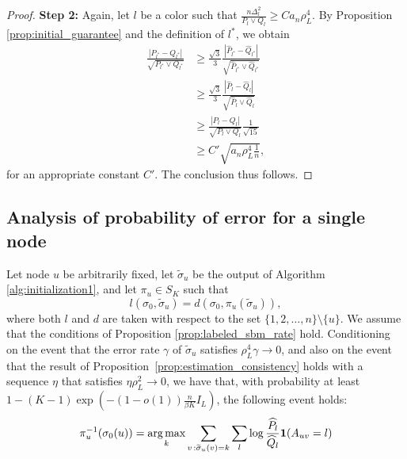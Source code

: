 \documentclass{article}
\begin{document}
\begin{proof}
\textbf{Step 2:} Again, let $l$ be a color such that $\frac{n \Delta_l^2}{P_l \vee Q_l} \geq C a_n \rho^4_L$. By Proposition \ref{prop:initial_guarantee} and the definition of $l^*$, we obtain
\begin{align*}
\frac{ |P_{l^*} - Q_{l^*}|}{\sqrt{ P_{l^*} \vee Q_{l^*}}} &\geq 
\frac{\sqrt{3}}{3} \frac{|\hat{P}_{l^*} - \hat{Q}_{l^*} | }{\sqrt{ \hat{P}_{l^*} \vee \hat{Q}_{l^*} }} 
  \\
& \geq
\frac{\sqrt{3}}{3} \frac{|\hat{P}_l - \hat{Q}_l | }{\sqrt{ \hat{P}_l \vee \hat{Q}_l}}  \\
 &\geq \frac{|P_l - Q_l|}{\sqrt{P_l \vee Q_l}} \frac{1}{\sqrt{15}}  \\
 &\geq C' \sqrt{a_n \rho^4_L \frac{1}{n} },
\end{align*}
for an appropriate constant $C'$. The conclusion thus follows.
\end{proof}


\subsection{Analysis of probability of error for a single node}
\label{appendix: single node}

\begin{proposition}
\label{prop:single_node_error_bound}
Let node $u$ be arbitrarily fixed, let $\tilde \sigma_u$ be the output of Algorithm \ref{alg:initialization1}, and let $\pi_u \in S_K$ such that
$$l(\sigma_0, \tilde \sigma_u) = d(\sigma_0, \pi_u(\tilde \sigma_u)),$$
where both $l$ and $d$ are taken with respect to the set $\{1, 2, \dots, n\} \setminus \{u\}$. We assume that the conditions of Proposition \ref{prop:labeled_sbm_rate} hold. Conditioning on the event that the error rate $\gamma$ of $\tilde \sigma_u$ satisfies $\rho_L^4 \gamma \to 0$, and also on the event that the result of Proposition~\ref{prop:estimation_consistency} holds with a sequence $\eta$ that satisfies $\eta \rho_L^2 \rightarrow 0$, we have that, with probability at least $1 - (K-1)\exp \left( - (1 - o(1)) \frac{n}{\beta K} I_L \right)$, the following event holds:
\[
\pi_u^{-1}(\sigma_0(u)) = \mathop{\text{\rm arg\,max}}_k \sum_{v\,: \widetilde \sigma_u(v)=k} \sum_l \log \frac{\widehat{P}_l}{\widehat{Q}_l} \mbox{\boldmath $1$}(A_{uv} = l) 
\]
\end{proposition}
\end{document}
